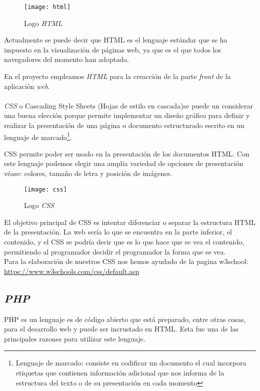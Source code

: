 \begin{wrapfigure}{r}{0.4\linewidth}
    \centering
    \texttt{[image: html]}
    \caption{Logo \textit{HTML}}
\end{wrapfigure}

Actualmente se puede decir que HTML es el lenguaje estándar que se ha
impuesto en la visualización de páginas web, ya que es el que todos los
navegadores del momento han adoptado.

En el proyecto empleamos \textit{HTML} para la creacción de la parte \textit{front} de la aplicación \textit{web}.\\\\

\textit{CSS}\cite{css} o Cascading Style Sheets (Hojas de estilo en cascada)se puede un considerar una buena elección porque permite implementar un diseño gráfico para definir y realizar la presentación de una página o documento estructurado escrito en un lenguaje de marcado\cite{marcado}\footnote{Lenguaje de marcado: consiste en codificar un documento el cual incorpora etiquetas que contienen información adicional que nos informa de la estructura del texto o de su presentación en cada momento}.

CSS permite poder ser usado en la presentación de los documentos HTML. Con este lenguaje podemos elegir una amplia variedad de opciones de presentación véase: colores, tamaño de letra y posición de imágenes.

\begin{wrapfigure}{l}{0.4\linewidth}
    \centering
    \texttt{[image: css]}
    \caption{Logo \textit{CSS}}
\end{wrapfigure}

El objetivo principal de CSS es intentar diferenciar o separar la estructura HTML de la presentación. La web sería lo que se encuentra en la parte inferior, el contenido, y el CSS se podría decir que es lo que hace que se vea el contenido, permitiendo al programador decidir el programador la forma que se vea.\\

Para la elaboración de nuestros CSS nos hemos ayudado de la pagina w3school: \url{https://www.w3schools.com/css/default.asp}

\subsection{\textit{PHP}}

PHP\cite{php1} es un lenguaje es de código abierto que está preparado, entre otras cosas, para el desarrollo web y puede ser incrustado en HTML. Esta fue una de las principales razones para utilizar este lenguaje.

